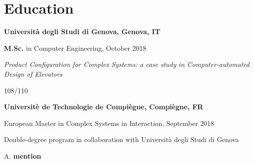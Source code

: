 \section{\sc Education}
{\bf Universit\`a degli Studi di Genova, Genova, IT}
\begin{list1}
\item[] \textbf{M.Sc.} in Computer Engineering, October 2018
\item[] \textit{Product Configuration for Complex Systems: a case study
	in Computer-automated Design of Elevators}
\item[] 108/110
\end{list1}

{\bf Universit\`e de Technologie de Compi\`egne, Compi\`egne, FR}
\begin{list1}
	\item[] European Master in Complex Systems in Interaction, September 2018
	\item[] Double-degree program in collaboration with Universit\`a 
	degli Studi di Genova
	\item[] A, \textbf{mention}
\end{list1}
%
